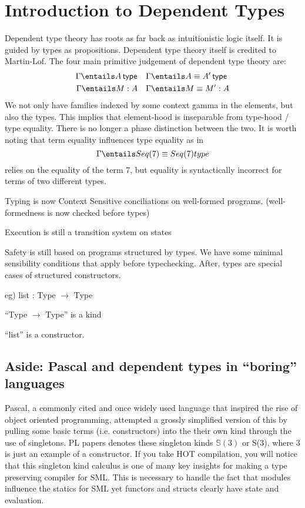 \documentclass[11pt]{article}
\begin{document}
\section*{Introduction to Dependent Types}

Dependent type theory has roots as far back as intuitionistic logic itself. It is guided by types as propositions. Dependent type theory itself is credited to Martin-Lof. The four main primitive judgement of dependent type theory are:
\begin{align*}
    \Gamma \entails \isTp{A} \quad & \Gamma \entails \eqTp{A}{A'} \\
    \Gamma \entails M : A \quad & \Gamma \entails M \equiv M' : A \\
\end{align*}
We not only have families indexed by some context gamma in the elements, but also the types. This implies that element-hood is inseparable from type-hood / type equality. There is no longer a phase distinction between the two. It is worth noting that term equality influences type equality as in
$$\Gamma \entails Seq(7) \equiv Seq(7) type$$
relies on the equality of the term 7, but equality is syntactically incorrect for terms of two different types.

Typing is now Context Sensitive conciliations on well-formed programs. (well-formedness is now checked before types)

Execution is still a transition system on states

Safety is still based on programs structured by types. We have some minimal sensibility conditions that apply before typechecking. After, types are special cases of structured constructors.

eg) list : Type $\rightarrow$ Type

``Type $\rightarrow$ Type'' is a kind 

``list'' is a constructor.

\subsection*{Aside: Pascal and dependent types in ``boring'' languages}

Pascal, a commonly cited and once widely used language that inspired the rise of object oriented programming, attempted a grossly simplified version of this by pulling some basic terms (i.e. constructors) into the their own kind through the use of singletons. PL papers denotes these singleton kinds $\mathbb{S}(3)$ or S(3), where 3 is just an example of a constructor. If you take HOT compilation, you will notice that this singleton kind calculus is one of many key insights for making a type preserving compiler for SML. This is necessary to handle the fact that modules influence the statics for SML yet functors and structs clearly have state and evaluation.
\end{document}
